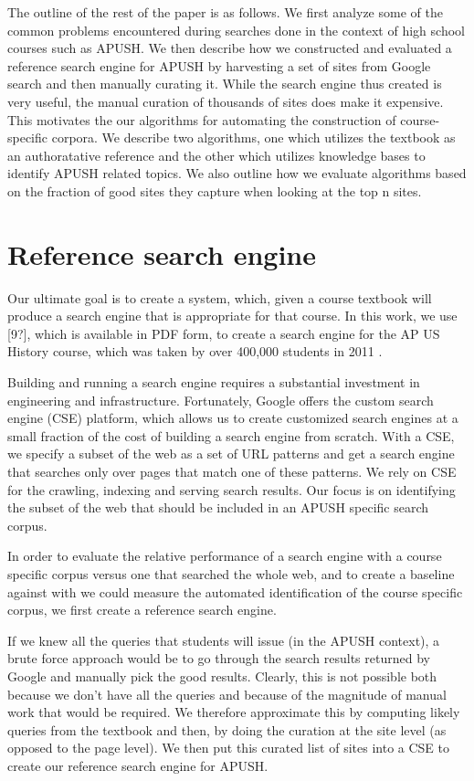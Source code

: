 \documentclass[pdfpagelabels=false,plainpages=true]{acm_proc_article-sp}
\begin{document}
The outline of the rest of the paper is as follows. We first analyze some of the
common problems encountered during searches done in the context of high school
courses such as APUSH. We then describe how we constructed and evaluated a
reference search engine for APUSH by harvesting a set of sites from Google
search and then manually curating it. While the search engine thus created is
very useful, the manual curation of thousands of sites does make it
expensive. This motivates the our algorithms for automating the construction of
course-specific corpora. We describe two algorithms, one which
utilizes the textbook as an authoratative reference and the other
which utilizes knowledge bases to identify APUSH related topics. We also outline
how we evaluate algorithms based on the fraction of good sites they capture when
looking at the top n sites.

\section{Reference search engine}

Our ultimate goal is to create a system, which, given a course textbook will
produce a search engine that is appropriate for that course. In this work, we
use [9?], which is available in PDF form, to create a search engine for the AP US
History course, which was taken by over 400,000 students in 2011 \cite{wikipedia}. 

Building and running a search engine requires a substantial investment in
engineering and infrastructure. Fortunately, Google offers the custom search
engine (CSE) platform, which allows us to create customized search engines at a
small fraction of the cost of building a search engine from scratch. With a CSE,
we specify a subset of the web as a set of URL patterns and get a search engine
that searches only over pages that match one of these patterns. We rely on CSE
for the crawling, indexing and serving search results. Our focus is on
identifying the subset of the web that should be included in an APUSH specific
search corpus. 

In order to evaluate the relative performance of a search engine with a course
specific corpus versus one that searched the whole web, and to create a baseline
against with we could measure the automated identification of the course
specific corpus, we first create a reference search engine. 

If we knew all the queries that students will issue (in the APUSH context), a
brute force approach would be to go through the search results returned by
Google and manually pick the good results. Clearly, this is not possible both
because we don't have all the queries and because of the magnitude of manual
work that would be required. We therefore approximate this by computing likely
queries from the textbook and then, by doing the curation at the site level (as
opposed to the page level). We then put this curated list of sites into a CSE to
create our reference search engine for APUSH. 
\end{document}
